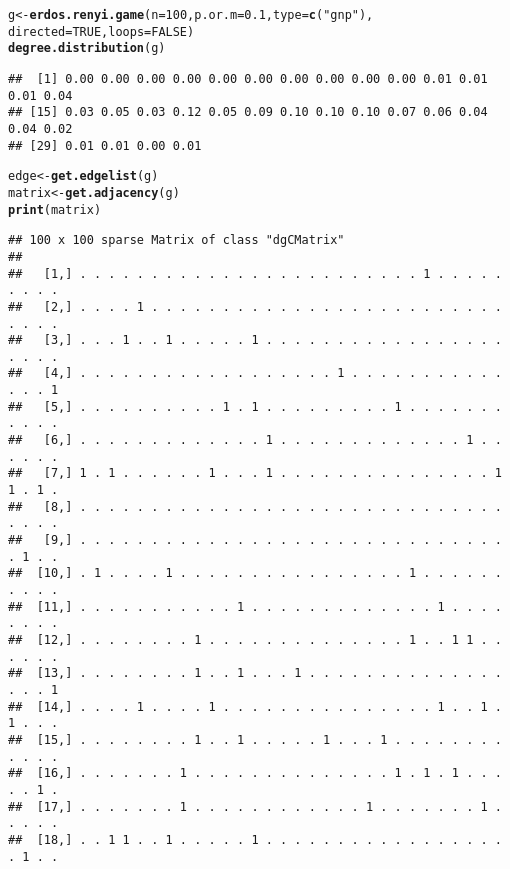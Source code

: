 \documentclass{article}\usepackage[]{graphicx}\usepackage[]{color}
\makeatletter
\newcommand{\hlnum}[1]{\textcolor[rgb]{0.686,0.059,0.569}{#1}}%
\newcommand{\hlstr}[1]{\textcolor[rgb]{0.192,0.494,0.8}{#1}}%
\newcommand{\hlstd}[1]{\textcolor[rgb]{0.345,0.345,0.345}{#1}}%
\newcommand{\hlkwb}[1]{\textcolor[rgb]{0.69,0.353,0.396}{#1}}%
\newcommand{\hlkwc}[1]{\textcolor[rgb]{0.333,0.667,0.333}{#1}}%
\newcommand{\hlkwd}[1]{\textcolor[rgb]{0.737,0.353,0.396}{\textbf{#1}}}%
\newenvironment{kframe}{%
 \def\at@end@of@kframe{}%
 \ifinner\ifhmode%
  \def\at@end@of@kframe{\end{minipage}}%
  \begin{minipage}{\columnwidth}%
 \fi\fi%
 \def\FrameCommand##1{\hskip\@totalleftmargin \hskip-\fboxsep
 \colorbox{shadecolor}{##1}\hskip-\fboxsep
     \hskip-\linewidth \hskip-\@totalleftmargin \hskip\columnwidth}%
 \MakeFramed {\advance\hsize-\width
   \@totalleftmargin\z@ \linewidth\hsize
   \@setminipage}}%
 {\par\unskip\endMakeFramed%
 \at@end@of@kframe}
\newenvironment{knitrout}{}{} %
\makeatother
\begin{document}
\begin{knitrout}
\begin{kframe}
{\ttfamily\noindent\bfseries\color{errorcolor}{\#\# Error: object 'saved.seed' not found}}\begin{alltt}
\hlstd{g} \hlkwb{<-} \hlkwd{erdos.renyi.game}\hlstd{(}\hlkwc{n} \hlstd{=} \hlnum{100}\hlstd{,} \hlkwc{p.or.m} \hlstd{=} \hlnum{0.1}\hlstd{,} \hlkwc{type} \hlstd{=} \hlkwd{c}\hlstd{(}\hlstr{"gnp"}\hlstd{),}
    \hlkwc{directed} \hlstd{=} \hlnum{TRUE}\hlstd{,} \hlkwc{loops} \hlstd{=} \hlnum{FALSE}\hlstd{)}
\hlkwd{degree.distribution}\hlstd{(g)}
\end{alltt}
\begin{verbatim}
##  [1] 0.00 0.00 0.00 0.00 0.00 0.00 0.00 0.00 0.00 0.00 0.01 0.01 0.01 0.04
## [15] 0.03 0.05 0.03 0.12 0.05 0.09 0.10 0.10 0.10 0.07 0.06 0.04 0.04 0.02
## [29] 0.01 0.01 0.00 0.01
\end{verbatim}
\begin{alltt}
\hlstd{edge} \hlkwb{<-} \hlkwd{get.edgelist}\hlstd{(g)}
\hlstd{matrix} \hlkwb{<-} \hlkwd{get.adjacency}\hlstd{(g)}
\hlkwd{print}\hlstd{(matrix)}
\end{alltt}
\begin{verbatim}
## 100 x 100 sparse Matrix of class "dgCMatrix"
##                                                                           
##   [1,] . . . . . . . . . . . . . . . . . . . . . . . . 1 . . . . . . . . .
##   [2,] . . . . 1 . . . . . . . . . . . . . . . . . . . . . . . . . . . . .
##   [3,] . . . 1 . . 1 . . . . . 1 . . . . . . . . . . . . . . . . . . . . .
##   [4,] . . . . . . . . . . . . . . . . . . 1 . . . . . . . . . . . . . . 1
##   [5,] . . . . . . . . . . 1 . 1 . . . . . . . . . 1 . . . . . . . . . . .
##   [6,] . . . . . . . . . . . . . 1 . . . . . . . . . . . . . 1 . . . . . .
##   [7,] 1 . 1 . . . . . . 1 . . . 1 . . . . . . . . . . . . . . . 1 1 . 1 .
##   [8,] . . . . . . . . . . . . . . . . . . . . . . . . . . . . . . . . . .
##   [9,] . . . . . . . . . . . . . . . . . . . . . . . . . . . . . . . 1 . .
##  [10,] . 1 . . . . 1 . . . . . . . . . . . . . . . . 1 . . . . . . . . . .
##  [11,] . . . . . . . . . . . 1 . . . . . . . . . . . . . 1 . . . . . . . .
##  [12,] . . . . . . . . 1 . . . . . . . . . . . . . . 1 . . 1 1 . . . . . .
##  [13,] . . . . . . . . 1 . . 1 . . . 1 . . . . . . . . . . . . . . . . . 1
##  [14,] . . . . 1 . . . . 1 . . . . . . . . . . . . . . . 1 . . 1 . 1 . . .
##  [15,] . . . . . . . . 1 . . 1 . . . . . 1 . . . 1 . . . . . . . . . . . .
##  [16,] . . . . . . . 1 . . . . . . . . . . . . . . 1 . 1 . 1 . . . . . 1 .
##  [17,] . . . . . . . 1 . . . . . . . . . . . . 1 . . . . . . . 1 . . . . .
##  [18,] . . 1 1 . . 1 . . . . . 1 . . . . . . . . . . . . . . . . . . 1 . .

\end{verbatim}
\end{kframe}
\end{knitrout}
\end{document}
